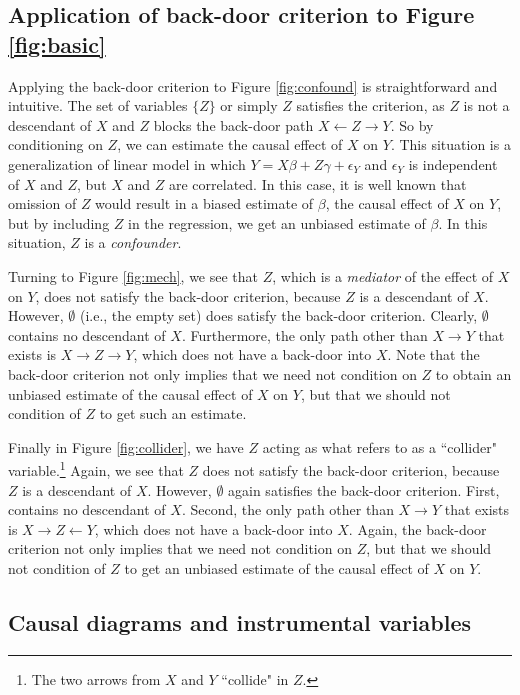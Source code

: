 \documentclass[12pt,reqno,titlepage]{amsart}
\theoremstyle{definition}
\begin{document}
 \subsection{Application of back-door criterion to Figure \ref{fig:basic}}
Applying the back-door criterion to Figure \ref{fig:confound} is straightforward and intuitive.
The set of variables $\{Z\}$ or simply $Z$ satisfies the criterion, as $Z$ is not a descendant of $X$ and $Z$ blocks the back-door path $X \leftarrow Z \rightarrow Y$.
So by conditioning on $Z$, we can estimate the causal effect of $X$ on $Y$.
This situation is a generalization of linear model in which $Y = X \beta + Z \gamma + \epsilon_Y$ and $\epsilon_Y$ is independent of $X$ and $Z$, but $X$ and $Z$ are correlated.
In this case, it is well known that omission of $Z$ would result in a biased estimate of $\beta$, the causal effect of $X$ on $Y$, but by including $Z$ in the regression, we get an unbiased estimate of $\beta$.
In this situation, $Z$ is a \emph{confounder}.

Turning to Figure \ref{fig:mech}, we see that $Z$, which is a \emph{mediator} of the effect of $X$ on $Y$, does not satisfy the back-door criterion, because $Z$ is a descendant of $X$.
However, $\emptyset$ (i.e., the empty set) does satisfy the back-door criterion.
Clearly, $\emptyset$ contains no descendant of $X$.
Furthermore, the only path other than $X \rightarrow Y$ that exists is $X \rightarrow Z \rightarrow Y$, which does not have a back-door into $X$.
Note that the back-door criterion not only implies that we need not condition on $Z$ to obtain an unbiased estimate of the causal effect of $X$ on $Y$, but that we should not condition of $Z$ to get such an estimate.

Finally in Figure \ref{fig:collider}, we have $Z$ acting as what \citet[p.\,17]{Pearl:2009kh} refers to as a ``collider" variable.\footnote{
The two arrows from $X$ and $Y$ ``collide" in $Z$.} 
Again, we see that $Z$ does not satisfy the back-door criterion, because $Z$ is a descendant of $X$.
However, $\emptyset$ again satisfies the back-door criterion.
First, contains no descendant of $X$.
Second, the only path other than $X \rightarrow Y$ that exists is $X \rightarrow Z \leftarrow Y$, which does not have a back-door into $X$.
Again, the back-door criterion not only implies that we need not condition on $Z$, but that we should not condition of $Z$ to get an unbiased estimate of the causal effect of $X$ on $Y$.

\subsection{Causal diagrams and instrumental variables}
\end{document}

